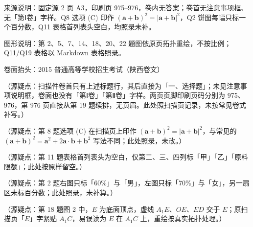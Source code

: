 

\begin{gktip}
来源说明：固定源 2 页 A3，印刷页 975–976，卷内无答案；卷首无注意事项框、无「第Ⅰ卷」字样。Q8 选项 (C) 印作 $(\boldsymbol{a}+\boldsymbol{b})^{2}=|\boldsymbol{a}+\boldsymbol{b}|^{2}$，Q2 饼图每幅只标一个百分数，Q11 表格首列表头空白，均照录未补。

图形说明：第 2、5、7、14、18、20、22 题图依原页拓扑重绘，不按比例；Q11/Q19 表格以 Markdown 表格照录。
\end{gktip}

\begin{gktip}
卷面抬头：2015 普通高等学校招生考试（陕西卷文）

（源疑点：扫描件卷首只有上述标题行，其后直接为「一、选择题」；未见注意事项说明框，卷面也没有「第Ⅰ卷」「第Ⅱ卷」字样。两页页脚印刷页码分别为 975、976，第 976 页直接从第 19 题续排，无页眉。此处照扫描页记录，未按常见卷式补写。）

（源疑点：第 8 题选项 (C) 在扫描页上印作 $(\boldsymbol{a}+\boldsymbol{b})^{2}=|\boldsymbol{a}+\boldsymbol{b}|^{2}$，与常见的 $(\boldsymbol{a}+\boldsymbol{b})^{2}=\boldsymbol{a}^{2}+2\boldsymbol{a}\cdot\boldsymbol{b}+\boldsymbol{b}^{2}$ 写法不同；此处照录，未改。）

（源疑点：第 11 题表格首列表头为空白，仅第二、三、四列标「甲」「乙」「原料限额」；此处按原样留空。）

（源疑点：第 2 题右图只标「60\%」与「男」，左图只标「70\%」与「女」，另一扇区未标百分数；此处照录，未补算。）

（源疑点：第 18 题图 2 中，$E$ 为底面顶点，虚线 $A_{1}E$、$OE$、$ED$ 交于 $E$；原扫描页「$E$」字紧贴 $A_{1}C$，易误读为 $E$ 在 $A_{1}C$ 上，重绘按真实拓扑处理。）
\end{gktip}


